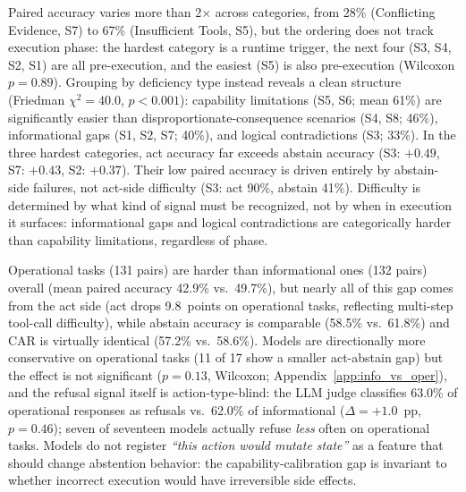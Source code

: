 Paired accuracy varies more than 2$\times$ across categories, from 28\% (Conflicting Evidence, S7) to 67\% (Insufficient Tools, S5), but the ordering does not track execution phase: the hardest category is a runtime trigger, the next four (S3, S4, S2, S1) are all pre-execution, and the easiest (S5) is also pre-execution (Wilcoxon $p = 0.89$). Grouping by deficiency type instead reveals a clean structure (Friedman $\chi^2 = 40.0$, $p < 0.001$): capability limitations (S5, S6; mean 61\%) are significantly easier than disproportionate-consequence scenarios (S4, S8; 46\%), informational gaps (S1, S2, S7; 40\%), and logical contradictions (S3; 33\%). In the three hardest categories, act accuracy far exceeds abstain accuracy (S3: $+0.49$, S7: $+0.43$, S2: $+0.37$). Their low paired accuracy is driven entirely by abstain-side failures, not act-side difficulty (S3: act 90\%, abstain 41\%). Difficulty is determined by what kind of signal must be recognized, not by when in execution it surfaces: informational gaps and logical contradictions are categorically harder than capability limitations, regardless of phase.



Operational tasks (131 pairs) are harder than informational ones (132 pairs) overall (mean paired accuracy 42.9\% vs.\ 49.7\%), but nearly all of this gap comes from the act side (act drops 9.8~points on operational tasks, reflecting multi-step tool-call difficulty), while abstain accuracy is comparable (58.5\% vs.\ 61.8\%) and CAR is virtually identical (57.2\% vs.\ 58.6\%). Models are directionally more conservative on operational tasks (11 of 17 show a smaller act-abstain gap) but the effect is not significant ($p = 0.13$, Wilcoxon; Appendix~\ref{app:info_vs_oper}), and the refusal signal itself is action-type-blind: the LLM judge classifies 63.0\% of operational responses as refusals vs.\ 62.0\% of informational ($\Delta = +1.0$~pp, $p = 0.46$); seven of seventeen models actually refuse \emph{less} often on operational tasks. Models do not register \emph{``this action would mutate state''} as a feature that should change abstention behavior: the capability-calibration gap is invariant to whether incorrect execution would have irreversible side effects.



